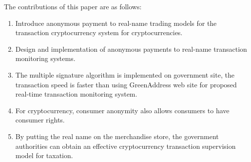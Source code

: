 \begin{eabstract}
	The contributions of this paper are as follows:
	\begin{enumerate}
		\item Introduce anonymous payment to real-name trading models for the transaction cryptocurrency system for cryptocurrencies.
		\item Design and implementation of anonymous payments to real-name transaction monitoring systems.
		\item The multiple signature algorithm is implemented on government site, the transaction speed is faster than using GreenAddress web site for proposed real-time transaction monitoring system. 
		\item For cryptocurrency, consumer anonymity also allows consumers to have consumer rights.
		\item By putting the real name on the merchandise store, the government authorities can obtain an effective cryptocurrency transaction supervision model for taxation.
	\end{enumerate}



\end{eabstract}

